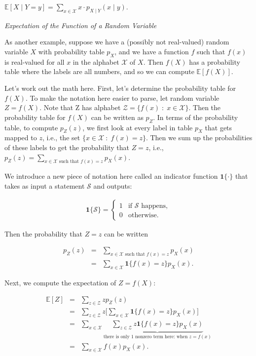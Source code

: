 \documentclass[6008notes.tex]{subfiles}
\begin{document}
{\centering$\mathbb {E}[X\mid Y=y]=\sum _{x\in \mathcal{X}}x\cdot p_{X\mid Y}(x\mid y).$ \par}
 
\textit{Expectation of the Function of a Random Variable}

As another example, suppose we have a (possibly not real-valued) random variable $X$ with probability table $p_X$, and we have a function $f$ such that $f(x)$ is real-valued for all $x$ in the alphabet $\mathcal{X}$ of $X$. Then $f(X)$ has a probability table where the labels are all numbers, and so we can compute $\mathbb {E}[f(X)]$.

Let's work out the math here. First, let's determine the probability table for $f(X)$. To make the notation here easier to parse, let random variable $Z=f(X)$. Note that Z has alphabet $\mathcal{Z}=\{ f(x)\; :\; x\in \mathcal{X}\}$. Then the probability table for $f(X)$ can be written as $p_Z$. In terms of the probability table, to compute $p_Z(z)$, we first look at every label in table $p_X$ that gets mapped to $z$, i.e., the set $\{ x\in \mathcal{X}\: :\; f(x)=z\}$. Then we sum up the probabilities of these labels to get the probability that $Z=z$, i.e., $p_{Z}(z)=\sum _{x\in \mathcal{X}\text { such that }f(x)=z}p_{X}(x)$.

We introduce a new piece of notation here called an indicator function $\mathbf{1}\{ \cdot \}$ that takes as input a statement $\mathcal{S}$ and outputs:

\begin{eqnarray*}
\mathbf{1}\{\mathcal{S}\}=\begin{cases}
1 & \text{if }\mathcal{S}\text{ happens},\\
0 & \text{otherwise}.
\end{cases}
\end{eqnarray*}
 
Then the probability that $Z=z$ can be written

\begin{eqnarray*}
p_{Z}(z) &=& \sum _{x\in \mathcal{X}\text { such that }f(x)=z}p_{X}(x) \\
				 &=& \sum _{x\in \mathcal{X}}\mathbf{1}\{ f(x)=z\} p_{X}(x).
\end{eqnarray*}

Next, we compute the expectation of $Z=f(X)$:

\begin{eqnarray*}
\mathbb {E}[Z] &=& \sum _{z\in \mathcal{Z}}zp_{Z}(z) \\
			&=& \sum _{z\in \mathcal{Z}}z\bigg[\sum _{x\in \mathcal{X}}\mathbf{1}\{ f(x)=z\} p_{X}(x)\bigg] \\
			&=& \sum _{x\in \mathcal{X}}\underbrace{\sum _{z\in \mathcal{Z}}z\mathbf{1}\{ f(x)=z\} p_{X}(x)}_{\text {there is only 1 nonzero term here: when }z=f(x)} \\
			&=& \sum _{x\in \mathcal{X}}f(x)p_{X}(x).
\end{eqnarray*}
 
\end{document}
